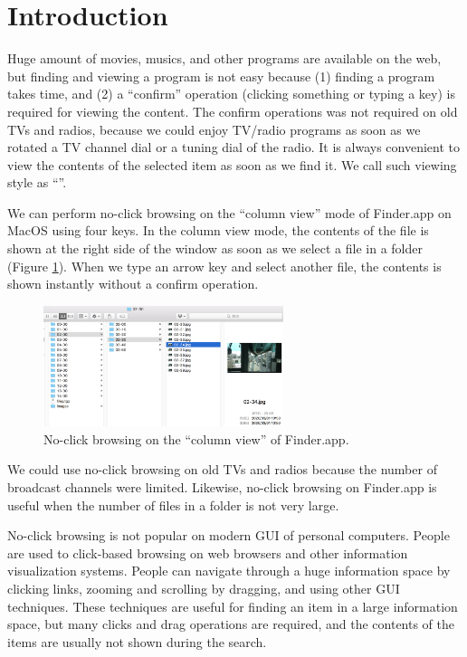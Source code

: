 \documentclass[conference]{IEEEtran}
\begin{document}

\section{Introduction}

% 

Huge amount of movies, musics, and other programs are available on the web, but
finding and viewing a program is not easy because
(1) finding a program takes time, and
(2) a ``confirm'' operation (clicking something or typing a key)
is required for viewing the content.
%
The confirm operations was not required on old TVs and radios,
because we could enjoy TV/radio programs
as soon as we rotated a TV channel dial or a tuning dial of the radio.
%
It is always convenient to view the contents of the selected item
as soon as we find it.
We call such viewing style as ``''.

We can perform no-click browsing on the ``column view'' mode of Finder.app on
MacOS using four keys.
In the column view mode, 
the contents of the file is shown at the right side of the window
as soon as we select a file in a folder (Figure \ref{noclickfinder}).
When we type an arrow key and select another file,
the contents is shown instantly without a confirm operation.

\begin{figure}[H]
  \centerline{\includegraphics[width=70mm,bb=0 0 839 423]{figures/10d7ca6c55aa93ebcdab799246e4c087.jpg}}
  \caption{No-click browsing on the ``column view'' of Finder.app.}
  \label{noclickfinder}
\end{figure}

We could use no-click browsing on old TVs and radios because the number of
broadcast channels were limited.
Likewise, no-click browsing on Finder.app is useful
when the number of files in a folder is not very large.

No-click browsing is not popular on modern GUI of personal computers.
People are used to click-based browsing on web browsers and other
information visualization systems.
People can navigate through a huge information space by
clicking links, zooming and scrolling by dragging, and using other GUI techniques.
These techniques are useful for finding an item in a large information space,
but many clicks and drag operations are required,
and the contents of the items are usually not shown during the search.
\end{document}
